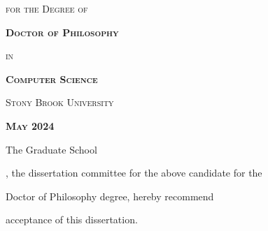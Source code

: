 \documentclass[
11pt, %
oneside, %
english, %
singlespacing, %
liststotoc, %
headsepline, %
]{MastersDoctoralThesis} %
\begin{document}
\begin{titlepage}
\begin{center}
    \noindent \textsc{for the Degree of}
    
    \vspace{0.45cm}
    
    \noindent \textsc{\textbf{Doctor of Philosophy}}
    
    \vspace{0.45cm}
    
    \noindent \textsc{in}
    
    \vspace{0.45cm}
    
    \noindent \textsc{\textbf{Computer Science}}
    
    \noindent 
    
    \vspace{1.2cm}
    
    \noindent \textsc{Stony Brook University}
    
    \noindent 
    
    \vspace{1.2cm}
    
    \noindent \textsc{\textbf{May 2024}}
    
    \noindent \eject 

    
    \setcounter{page}{2}
    
    
    \vspace{0.25cm}
    
    \noindent The Graduate School
    
    \vspace{0.5cm}
    
    \noindent \textbf{\authorname}
    
    \vspace{0.5cm}
    
    , the dissertation committee for the above candidate for the
    
    \vspace{0.25cm}
    \noindent Doctor of Philosophy degree, hereby recommend
    
    \vspace{0.25cm}
    \noindent acceptance of this dissertation.
    
    \noindent 
    
    \vspace{1.0cm}
     

\end{center}
\end{titlepage}
\end{document}
